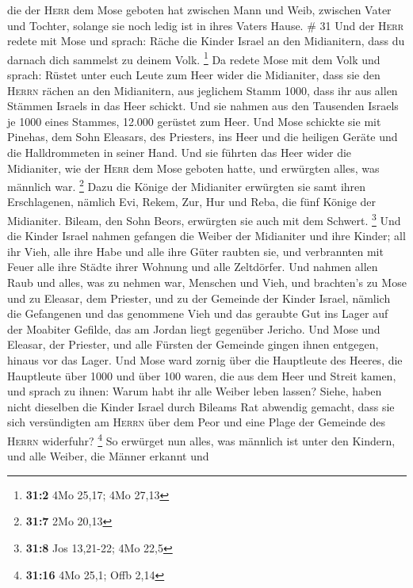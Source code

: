die der \textsc{Herr} dem Mose geboten hat zwischen Mann und Weib,
zwischen Vater und Tochter, solange sie noch ledig ist in ihres Vaters
Hause. \# 31  Und der \textsc{Herr} redete mit Mose und
sprach:  Räche die Kinder Israel an den Midianitern, dass
du darnach dich sammelst zu deinem Volk. \footnote{\textbf{31:2} 4Mo
  25,17; 4Mo 27,13}  Da redete Mose mit dem Volk und
sprach: Rüstet unter euch Leute zum Heer wider die Midianiter, dass sie
den \textsc{Herrn} rächen an den Midianitern,  aus
jeglichem Stamm 1000, dass ihr aus allen Stämmen Israels in das Heer
schickt.  Und sie nahmen aus den Tausenden Israels je 1000
eines Stammes, 12.000 gerüstet zum Heer.  Und Mose
schickte sie mit Pinehas, dem Sohn Eleasars, des Priesters, ins Heer und
die heiligen Geräte und die Halldrommeten in seiner Hand. 
Und sie führten das Heer wider die Midianiter, wie der \textsc{Herr} dem
Mose geboten hatte, und erwürgten alles, was männlich war. \footnote{\textbf{31:7}
  2Mo 20,13}  Dazu die Könige der Midianiter erwürgten sie
samt ihren Erschlagenen, nämlich Evi, Rekem, Zur, Hur und Reba, die fünf
Könige der Midianiter. Bileam, den Sohn Beors, erwürgten sie auch mit
dem Schwert. \footnote{\textbf{31:8} Jos 13,21-22; 4Mo 22,5}
 Und die Kinder Israel nahmen gefangen die Weiber der
Midianiter und ihre Kinder; all ihr Vieh, alle ihre Habe und alle ihre
Güter raubten sie,  und verbrannten mit Feuer alle ihre
Städte ihrer Wohnung und alle Zeltdörfer.  Und nahmen
allen Raub und alles, was zu nehmen war, Menschen und Vieh,
 und brachten's zu Mose und zu Eleasar, dem Priester, und
zu der Gemeinde der Kinder Israel, nämlich die Gefangenen und das
genommene Vieh und das geraubte Gut ins Lager auf der Moabiter Gefilde,
das am Jordan liegt gegenüber Jericho.  Und Mose und
Eleasar, der Priester, und alle Fürsten der Gemeinde gingen ihnen
entgegen, hinaus vor das Lager.  Und Mose ward zornig
über die Hauptleute des Heeres, die Hauptleute über 1000 und über 100
waren, die aus dem Heer und Streit kamen,  und sprach zu
ihnen: Warum habt ihr alle Weiber leben lassen?  Siehe,
haben nicht dieselben die Kinder Israel durch Bileams Rat abwendig
gemacht, dass sie sich versündigten am \textsc{Herrn} über dem Peor und
eine Plage der Gemeinde des \textsc{Herrn} widerfuhr? \footnote{\textbf{31:16}
  4Mo 25,1; Offb 2,14}  So erwürget nun alles, was
männlich ist unter den Kindern, und alle Weiber, die Männer erkannt und
